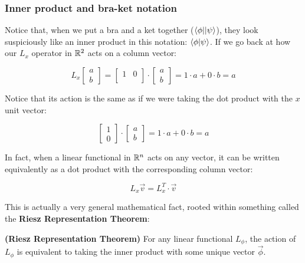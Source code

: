 \subsubsection{Inner product and bra-ket notation}

Notice that, when we put a bra and a ket together ($\langle\phi||\psi\rangle$), they look suspiciously like an inner product in this notation: $\langle\phi|\psi\rangle$. If we go back at how our $L_x$ operator in $\mathbb{R}^2$ acts on a column vector:

\begin{equation}
    L_x\begin{bmatrix}
        a \\ b
    \end{bmatrix} =
    \begin{bmatrix}
        1 & 0 \\
    \end{bmatrix}\cdot
    \begin{bmatrix}
        a \\ b
    \end{bmatrix} = 1 \cdot a + 0\cdot b = a
\end{equation}

Notice that its action is the same as if we were taking the dot product with the $x$ unit vector:

\begin{equation}
    \begin{bmatrix}
        1 \\ 0
    \end{bmatrix}\cdot
    \begin{bmatrix}
        a \\ b
    \end{bmatrix} = 1 \cdot a + 0\cdot b = a
\end{equation}

In fact, when a linear functional in $\mathbb{R}^n$ acts on any vector, it can be written equivalently as a dot product with the corresponding column vector:

\begin{equation}
    L_x \vec{v} = L_x^T\cdot \vec{v}
\end{equation}

This is actually a very general mathematical fact, rooted within something called the \textbf{Riesz Representation Theorem}:

\begin{theorem}
    \textbf{(Riesz Representation Theorem)} For any linear functional $L_\phi$, the action of $L_\phi$ is equivalent to taking the inner product with some unique vector $\vec{\phi}$.
\end{theorem}

